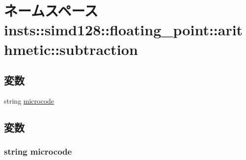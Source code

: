 \hypertarget{namespaceinsts_1_1simd128_1_1floating__point_1_1arithmetic_1_1subtraction}{
\section{ネームスペース insts::simd128::floating\_\-point::arithmetic::subtraction}
\label{namespaceinsts_1_1simd128_1_1floating__point_1_1arithmetic_1_1subtraction}
}
\subsection*{変数}
\begin{DoxyCompactItemize}
\item 
string \hyperlink{namespaceinsts_1_1simd128_1_1floating__point_1_1arithmetic_1_1subtraction_a770f11a173e99389a8802f0107ed8f52}{microcode}
\end{DoxyCompactItemize}


\subsection{変数}
\hypertarget{namespaceinsts_1_1simd128_1_1floating__point_1_1arithmetic_1_1subtraction_a770f11a173e99389a8802f0107ed8f52}{
\subsubsection[{microcode}]{\setlength{\rightskip}{0pt plus 5cm}string {\bf microcode}}}
\label{namespaceinsts_1_1simd128_1_1floating__point_1_1arithmetic_1_1subtraction_a770f11a173e99389a8802f0107ed8f52}
